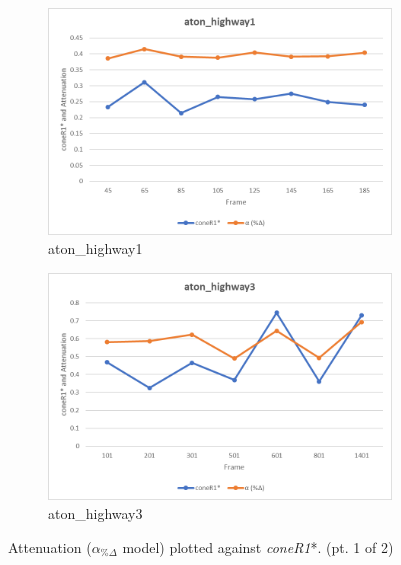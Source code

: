 \begin{appendices}
\begin{figure}
\begin{subfigure}{.45\linewidth}
  \includegraphics[width=1\linewidth]{figures/appendix/highway1_rgb.jpg}
  \caption{aton\_highway1}
\end{subfigure}
\hfill
\begin{subfigure}{.45\linewidth}
  \includegraphics[width=1\linewidth]{figures/appendix/highway3_rgb.jpg}
  \caption{aton\_highway3}
\end{subfigure}

\caption{Attenuation ($\alpha_{\%\Delta}$ model) plotted against \textit{coneR1}*. (pt. 1 of 2)}
\end{figure}


\end{appendices}
